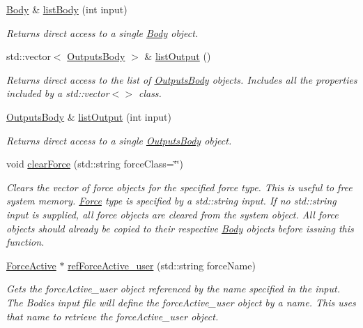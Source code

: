 \begin{DoxyCompactItemize}
\hyperlink{classosea_1_1ofreq_1_1_body}{Body} \& \hyperlink{classosea_1_1ofreq_1_1_system_af91978b3309a287948fc55773c4193e5}{list\-Body} (int input)
\begin{DoxyCompactList}\small\item\em Returns direct access to a single \hyperlink{classosea_1_1ofreq_1_1_body}{Body} object. \end{DoxyCompactList}\item 
std\-::vector$<$ \hyperlink{classosea_1_1ofreq_1_1_outputs_body}{Outputs\-Body} $>$ \& \hyperlink{classosea_1_1ofreq_1_1_system_ad2c5c4c5be9ed1b30651a267df67c466}{list\-Output} ()
\begin{DoxyCompactList}\small\item\em Returns direct access to the list of \hyperlink{classosea_1_1ofreq_1_1_outputs_body}{Outputs\-Body} objects. Includes all the properties included by a std\-::vector$<$$>$ class. \end{DoxyCompactList}\item 
\hyperlink{classosea_1_1ofreq_1_1_outputs_body}{Outputs\-Body} \& \hyperlink{classosea_1_1ofreq_1_1_system_a25b21c2fe11293ecf46ee3f9371afe21}{list\-Output} (int input)
\begin{DoxyCompactList}\small\item\em Returns direct access to a single \hyperlink{classosea_1_1ofreq_1_1_outputs_body}{Outputs\-Body} object. \end{DoxyCompactList}\item 
void \hyperlink{classosea_1_1ofreq_1_1_system_ac2c9763916fdfe6a7858c0efa87504c2}{clear\-Force} (std\-::string force\-Class=\char`\"{}\char`\"{})
\begin{DoxyCompactList}\small\item\em Clears the vector of force objects for the specified force type. This is useful to free system memory. \hyperlink{classosea_1_1ofreq_1_1_force}{Force} type is specified by a std\-::string input. If no std\-::string input is supplied, all force objects are cleared from the system object. All force objects should already be copied to their respective \hyperlink{classosea_1_1ofreq_1_1_body}{Body} objects before issuing this function. \end{DoxyCompactList}\item 
\hyperlink{classosea_1_1ofreq_1_1_force_active}{Force\-Active} $\ast$ \hyperlink{classosea_1_1ofreq_1_1_system_a5150d261d9a532b78a3e94807042e8d0}{ref\-Force\-Active\-\_\-user} (std\-::string force\-Name)
\begin{DoxyCompactList}\small\item\em Gets the force\-Active\-\_\-user object referenced by the name specified in the input. The Bodies input file will define the force\-Active\-\_\-user object by a name. This uses that name to retrieve the force\-Active\-\_\-user object. \end{DoxyCompactList}\item 

\end{DoxyCompactItemize}

